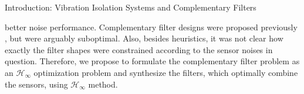 \documentclass{beamer}
\begin{document}
\begin{frame}[t]
\begin{columns}[t]
\begin{column}{0.32\linewidth}
\begin{block}{Introduction: Vibration Isolation Systems and Complementary Filters}
				
				better noise performance.
				Complementary filter designs were proposed previously \cite{Sekiguchi:2016bmv,vanHeijningen:2018cpc,low_frequency_optimization_and_performance_of_advanced_virgo_seismic_isolation_system}, but were arguably suboptimal.
				Also, besides heuristics, it was not clear how exactly the filter shapes were constrained according to the sensor noises in question.
				Therefore, we propose to formulate the complementary filter problem as an $\mathcal{H}_\infty$ optimization problem and synthesize the filters, which optimally combine the sensors, using $\mathcal{H}_\infty$ method.
%				
%				
			\end{block}
				

\end{column}
\end{columns}
\end{frame}
\end{document}
